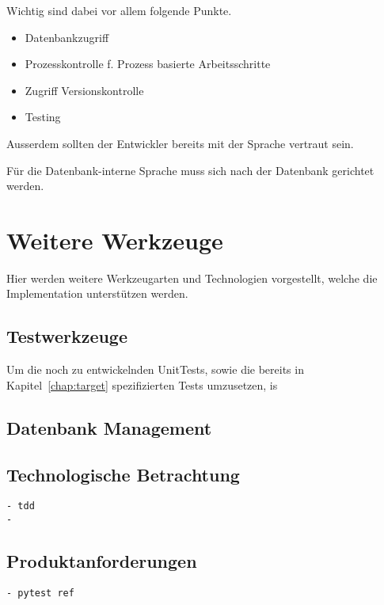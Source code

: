 Wichtig sind dabei vor allem folgende Punkte.
\begin{itemize}
    \item Datenbankzugriff 
    \item Prozesskontrolle f. Prozess basierte Arbeitsschritte
    \item Zugriff Versionskontrolle
    \item Testing
\end{itemize}

Ausserdem sollten der Entwickler bereits mit der Sprache vertraut sein.

F\"ur die Datenbank-interne Sprache muss sich nach der Datenbank gerichtet werden.


\section{Weitere Werkzeuge}

Hier werden weitere Werkzeugarten und Technologien vorgestellt,
welche die Implementation unterst\"utzen werden.

\subsection{Testwerkzeuge}

Um die noch zu entwickelnden UnitTests,
sowie die bereits in Kapitel~\ref{chap:target} spezifizierten Tests umzusetzen,
is

\subsection{Datenbank Management}

\subsection{Technologische Betrachtung}
\begin{verbatim}
- tdd
- 
\end{verbatim}
\subsection{Produktanforderungen}
\begin{verbatim}
- pytest ref
\end{verbatim}
